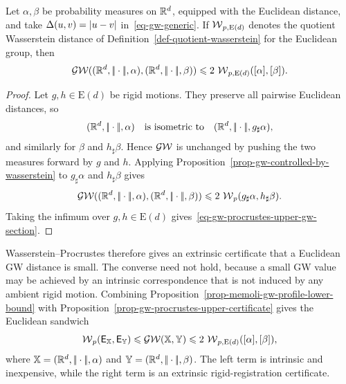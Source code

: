 \begin{prop}\label{prop-gw-procrustes-upper-certificate}
	Let $\alpha,\beta$ be probability measures on $\mathbb{R}^d$, equipped with the Euclidean distance, and take $\Delta(u,v)=|u-v|$ in~\eqref{eq-gw-generic}. If $\operatorname{\mathcal{W}}_{p,\mathrm E(d)}$ denotes the quotient Wasserstein distance of Definition~\ref{def-quotient-wasserstein} for the Euclidean group, then
	\begin{equation}\label{eq-gw-procrustes-upper-gw-section}
	\operatorname{\mathcal{GW}}((\mathbb{R}^d,|\!| \cdot |\!|,\alpha),(\mathbb{R}^d,|\!| \cdot |\!|,\beta))
	\leqslant
	2\,\operatorname{\mathcal{W}}_{p,\mathrm E(d)}([\alpha],[\beta]).
	\end{equation}
\end{prop}

\begin{proof}
	Let $g,h\in\mathrm E(d)$ be rigid motions. They preserve all pairwise Euclidean distances, so
	\[
	(\mathbb{R}^d,|\!| \cdot |\!|,\alpha)
	\quad\text{is isometric to}\quad
	(\mathbb{R}^d,|\!| \cdot |\!|,g_\sharp\alpha),
	\]
	and similarly for $\beta$ and $h_\sharp\beta$. Hence $\operatorname{\mathcal{GW}}$ is unchanged by pushing the two measures forward by $g$ and $h$. Applying Proposition~\ref{prop-gw-controlled-by-wasserstein} to $g_\sharp\alpha$ and $h_\sharp\beta$ gives
	\[
	\operatorname{\mathcal{GW}}((\mathbb{R}^d,|\!| \cdot |\!|,\alpha),(\mathbb{R}^d,|\!| \cdot |\!|,\beta))
	\leqslant
	2\,\operatorname{\mathcal{W}}_p(g_\sharp\alpha,h_\sharp\beta).
	\]
	Taking the infimum over $g,h\in\mathrm E(d)$ gives~\eqref{eq-gw-procrustes-upper-gw-section}.
\end{proof}

Wasserstein--Procrustes therefore gives an extrinsic certificate that a Euclidean GW distance is small. The converse need not hold, because a small GW value may be achieved by an intrinsic correspondence that is not induced by any ambient rigid motion. Combining Proposition~\ref{prop-memoli-gw-profile-lower-bound} with Proposition~\ref{prop-gw-procrustes-upper-certificate} gives the Euclidean sandwich
\begin{equation}\label{eq-gw-profile-procrustes-sandwich}
\operatorname{\mathcal{W}}_p(\mathsf E_{\mathbb{X}},\mathsf E_{\mathbb{Y}})
\leqslant
\operatorname{\mathcal{GW}}(\mathbb{X},\mathbb{Y})
\leqslant
2\,\operatorname{\mathcal{W}}_{p,\mathrm E(d)}([\alpha],[\beta]),
\end{equation}
where $\mathbb{X}=(\mathbb{R}^d,|\!| \cdot |\!|,\alpha)$ and $\mathbb{Y}=(\mathbb{R}^d,|\!| \cdot |\!|,\beta)$. The left term is intrinsic and inexpensive, while the right term is an extrinsic rigid-registration certificate.

